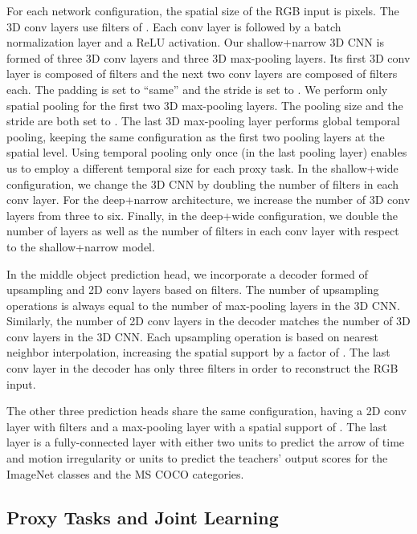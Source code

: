 \documentclass[final]{cvpr}
\begin{document}
For each network configuration, the spatial size of the RGB input is  pixels. The 3D conv layers use filters of . Each conv layer is followed by a batch normalization layer and a ReLU activation. Our shallow+narrow 3D CNN is formed of three 3D conv layers and three 3D max-pooling layers. Its first 3D conv layer is composed of  filters and the next two conv layers are composed of  filters each. The padding is set to ``same'' and the stride is set to . We perform only spatial pooling for the first two 3D max-pooling layers. The pooling size and the stride are both set to . The last 3D max-pooling layer performs global temporal pooling, keeping the same configuration as the first two pooling layers at the spatial level. Using temporal pooling only once (in the last pooling layer) enables us to employ a different temporal size for each proxy task. In the shallow+wide configuration, we change the 3D CNN by doubling the number of filters in each conv layer. For the deep+narrow architecture, we increase the number of 3D conv layers from three to six. Finally, in the deep+wide configuration, we double the number of layers as well as the number of filters in each conv layer with respect to the shallow+narrow model.

In the middle object prediction head, we incorporate a decoder formed of upsampling and 2D conv layers based on  filters. The number of upsampling operations is always equal to the number of max-pooling layers in the 3D CNN. Similarly, the number of 2D conv layers in the decoder matches the number of 3D conv layers in the 3D CNN. Each upsampling operation is based on nearest neighbor interpolation, increasing the spatial support by a factor of . The last conv layer in the decoder has only three filters in order to reconstruct the RGB input. 

The other three prediction heads share the same configuration, having a 2D conv layer with  filters and a max-pooling layer with a spatial support of . The last layer is a fully-connected layer with either two units to predict the arrow of time and motion irregularity or  units to predict the teachers' output scores for the  ImageNet \cite{Russakovsky2015} classes and the  MS COCO \cite{Lin-ECCV-2014} categories.

\vspace*{-0.1cm}
\subsection{Proxy Tasks and Joint Learning}
\vspace*{-0.1cm}
\end{document}
